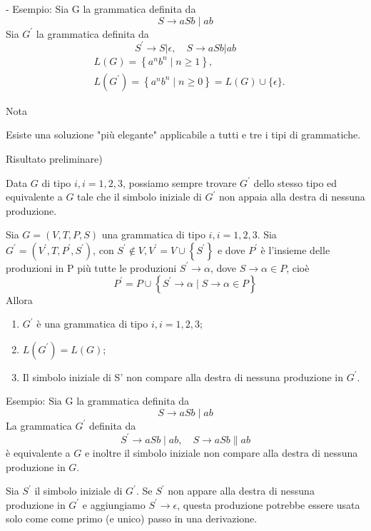- Esempio: Sia G la grammatica definita da
$$
S \rightarrow a S b \mid a b
$$
Sia $G^{\prime}$ la grammatica definita da
$$
S^{\prime} \rightarrow S|\epsilon, \quad S \rightarrow a S b| a b
$$
$$
\begin{aligned}
&L(G)=\left\{a^{n} b^{n} \mid n \geq 1\right\}, \\
&L\left(G^{\prime}\right)=\left\{a^{n} b^{n} \mid n \geq 0\right\}=L(G) \cup\{\epsilon\} .
\end{aligned}
$$

Nota

Esiste una soluzione "più elegante" applicabile a tutti e tre i tipi di grammatiche.

Risultato preliminare)

Data $G$ di tipo $i, i=1,2,3$, possiamo sempre trovare $G^{\prime}$ dello stesso tipo ed equivalente a $G$ tale che il simbolo iniziale di $G^{\prime}$ non appaia alla destra di nessuna produzione.

Sia $G=(V, T, P, S)$ una grammatica di tipo $i, i=1,2,3$.
Sia $G^{\prime}=\left(V^{\prime}, T, P^{\prime}, S^{\prime}\right)$, con $S^{\prime} \notin V, V^{\prime}=V \cup\left\{S^{\prime}\right\}$ e dove $P^{\prime}$ è
l'insieme delle produzioni in P più tutte le produzioni $S^{\prime} \rightarrow \alpha$, dove $S \rightarrow \alpha \in P$, cioè
$$
P^{\prime}=P \cup\left\{S^{\prime} \rightarrow \alpha \mid S \rightarrow \alpha \in P\right\}
$$
Allora
\begin{enumerate}
    \item $G^{\prime}$ è una grammatica di tipo $i, i=1,2,3$;
    \item $L\left(G^{\prime}\right)=L(G)$;
    \item Il simbolo iniziale di S' non compare alla destra di nessuna produzione in $G^{\prime}$.
\end{enumerate}

Esempio: Sia G la grammatica definita da
$$
S \rightarrow a S b \mid a b
$$
La grammatica $G^{\prime}$ definita da
$$
S^{\prime} \rightarrow a S b \mid a b, \quad S \rightarrow a S b \| a b
$$
è equivalente a $G$ e inoltre il simbolo iniziale non compare alla destra di nessuna produzione in $G$.

\vspace{5mm}

Sia $S^{\prime}$ il simbolo iniziale di $G^{\prime} .$ Se $S^{\prime}$ non appare alla destra di nessuna produzione in $G^{\prime}$ e aggiungiamo $S^{\prime} \rightarrow \epsilon$, questa produzione potrebbe essere usata solo come come primo (e unico) passo in una derivazione.

